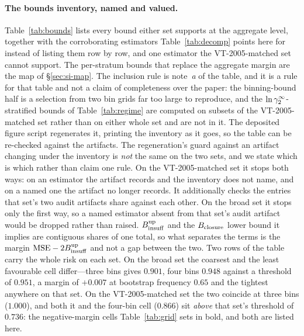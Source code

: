 \paragraph{The bounds inventory, named and valued.}
\label{sec:si-bounds-inv}
Table~\ref{tab:bounds} lists
every bound either set supports at the aggregate level, together with the
corroborating estimators Table~\ref{tab:decomp} points here for instead of listing them row by
row, and one estimator the VT-2005-matched set cannot support. The per-stratum bounds that replace
the aggregate margin are the map of \S\ref{sec:si-map}.
The inclusion rule is note~\emph{a} of the table, and it is a rule for that table and not a
claim of completeness over the paper: the binning-bound half is a selection from two bin grids far too large
to reproduce, and the $\ln\gamma_2^\infty$-stratified bounds of Table~\ref{tab:regime} are computed on subsets of the
VT-2005-matched set rather than on either whole set and are not in it. The deposited figure script
regenerates it, printing the inventory as it goes, so the table can be
re-checked against the artifacts. The regeneration's guard against an artifact changing under the
inventory is \emph{not} the same on the two sets, and we state which is which rather than claim one
rule. On the VT-2005-matched set it stops both ways: on an estimator the artifact records and the inventory does
not name, and on a named one the artifact no longer records. It additionally checks the entries
that set's two audit artifacts share against each other. On the broad set it stops only the first
way, so a named estimator absent from that set's audit artifact would be dropped rather than raised.
$B_{\mathrm{insuff}}^{\text{up}}$ and the $B_{\mathrm{closure}}$ lower bound it implies are contiguous shares of one total, so
what separates the terms is the margin $\mathrm{MSE}-2B_{\mathrm{insuff}}^{\text{up}}$ and not a gap between the
two. Two rows of the table carry the whole risk on each set. On the
broad set the coarsest and the least favourable cell differ---three bins gives $0.901$, four bins
$0.948$ against a threshold of $0.951$, a margin of $+0.007$ at bootstrap frequency $0.65$ and the
tightest anywhere on that set. On the VT-2005-matched set the two coincide at three bins ($1.000$), and both it
and the four-bin cell ($0.866$) sit \emph{above} that set's threshold of $0.736$: the
negative-margin cells Table~\ref{tab:grid} sets in bold, and both are listed here.

